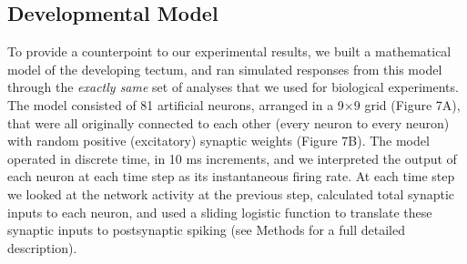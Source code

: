 \documentclass{article}
\begin{document}

\subsection*{Developmental Model}

To provide a counterpoint to our experimental results, we built a mathematical model of the developing tectum, and ran simulated responses from this model through the  \textit{exactly same} set of analyses that we used for biological experiments. The model consisted of 81 artificial neurons, arranged in a 9$\times$9 grid (Figure 7A), that were all originally connected to each other (every neuron to every neuron) with random positive (excitatory) synaptic weights (Figure 7B). The model operated in discrete time, in 10 ms increments, and we interpreted the output of each neuron at each time step as its instantaneous firing rate. At each time step we looked at the network activity at the previous step, calculated total synaptic inputs to each neuron, and used a sliding logistic function to translate these synaptic inputs to postsynaptic spiking (see Methods for a full detailed description).
\end{document}
